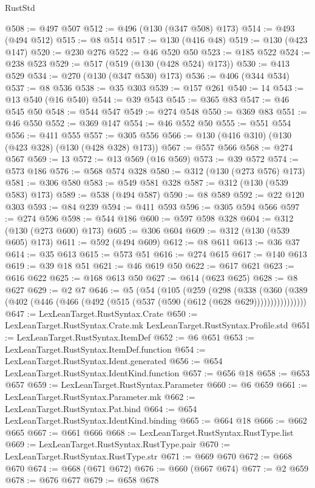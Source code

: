 \begin{lexlean}{RustStd}
\begin{coremodule}
@508 := @497 @507
@512 := @496 (@130 (@347 @508) @173)
@514 := @493 (@494 @512)
@515 := @8 @514
@517 := @130 (@416 @48)
@519 := @130 (@423 @147)
@520 := @230 @276
@522 := @46 @520 @50
@523 := @185 @522
@524 := @238 @523
@529 := @517 (@519 (@130 (@428 @524) @173))
@530 := @413 @529
@534 := @270 (@130 (@347 @530) @173)
@536 := @406 (@344 @534)
@537 := @8 @536
@538 := @35 @303
@539 := @157 @261
@540 := 14
@543 := @13 @540 (@16 @540)
@544 := @39 @543
@545 := @365 @83
@547 := @46 @545 @50
@548 := @544 @547
@549 := @274 @548
@550 := @369 @83
@551 := @46 @550
@552 := @369 @147
@554 := @46 @552 @50
@555 := @551 @554
@556 := @411 @555
@557 := @305 @556
@566 := @130 (@416 @310) (@130 (@423 @328) (@130 (@428 @328) @173))
@567 := @557 @566
@568 := @274 @567
@569 := 13
@572 := @13 @569 (@16 @569)
@573 := @39 @572
@574 := @573 @186
@576 := @568 @574 @328
@580 := @312 (@130 (@273 @576) @173)
@581 := @306 @580
@583 := @549 @581 @328
@587 := @312 (@130 (@539 @583) @173)
@589 := @538 (@494 @587)
@590 := @8 @589
@592 := @22 @120 @303
@593 := @84 @239
@594 := @411 @593
@596 := @305 @594 @566
@597 := @274 @596
@598 := @544 @186
@600 := @597 @598 @328
@604 := @312 (@130 (@273 @600) @173)
@605 := @306 @604
@609 := @312 (@130 (@539 @605) @173)
@611 := @592 (@494 @609)
@612 := @8 @611
@613 := @36 @37
@614 := @35 @613
@615 := @573 @51
@616 := @274 @615
@617 := @140 @613
@619 := @39 @18 @51
@621 := @46 @619 @50
@622 := @617 @621
@623 := @616 @622
@625 := @168 @613 @50
@627 := @614 (@623 @625)
@628 := @8 @627
@629 := @2 @7
@646 := @5
    (@54
      (@105
        (@259
          (@298
            (@338
              (@360 (@389 (@402 (@446 (@466 (@492 (@515 (@537 (@590 (@612 (@628 @629))))))))))))))))
@647 := LexLeanTarget.RustSyntax.Crate
@650 := LexLeanTarget.RustSyntax.Crate.mk LexLeanTarget.RustSyntax.Profile.std
@651 := LexLeanTarget.RustSyntax.ItemDef
@652 := @6 @651
@653 := LexLeanTarget.RustSyntax.ItemDef.function
@654 := LexLeanTarget.RustSyntax.Ident.generated
@656 := @654 LexLeanTarget.RustSyntax.IdentKind.function
@657 := @656 @18
@658 := @653 @657
@659 := LexLeanTarget.RustSyntax.Parameter
@660 := @6 @659
@661 := LexLeanTarget.RustSyntax.Parameter.mk
@662 := LexLeanTarget.RustSyntax.Pat.bind
@664 := @654 LexLeanTarget.RustSyntax.IdentKind.binding
@665 := @664 @18
@666 := @662 @665
@667 := @661 @666
@668 := LexLeanTarget.RustSyntax.RustType.list
@669 := LexLeanTarget.RustSyntax.RustType.pair
@670 := LexLeanTarget.RustSyntax.RustType.str
@671 := @669 @670
@672 := @668 @670
@674 := @668 (@671 @672)
@676 := @660 (@667 @674)
@677 := @2 @659
@678 := @676 @677
@679 := @658 @678

\end{coremodule}
\end{lexlean}
